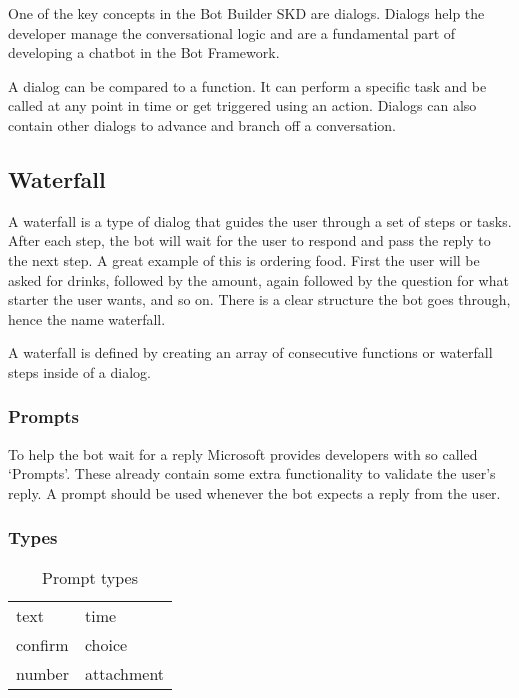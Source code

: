 One of the key concepts in the Bot Builder SKD are dialogs. Dialogs help the developer manage the conversational logic and are a fundamental part of developing a chatbot in the Bot Framework.

A dialog can be compared to a function. It can perform a specific task and be called at any point in time or get triggered using an action. Dialogs can also contain other dialogs to advance and branch off a conversation.

\subsection{Waterfall}

A waterfall is a type of dialog that guides the user through a set of steps or tasks. After each step, the bot will wait for the user to respond and pass the reply to the next step. A great example of this is ordering food. First the user will be asked for drinks, followed by the amount, again followed by the question for what starter the user wants, and so on. There is a clear structure the bot goes through, hence the name waterfall.

A waterfall is defined by creating an array of consecutive functions or waterfall steps inside of a dialog.

\subsubsection{Prompts}

To help the bot wait for a reply Microsoft provides developers with so called `Prompts'. These already contain some extra functionality to validate the user's reply. A prompt should be used whenever the bot expects a reply from the user.

\subsubsection{Types}

\renewcommand{\arraystretch}{1}
\begin{table}[ht]
	\centering
	\begin{tabular}{|l|l|}
		\hline
		text    & time       \\
		confirm & choice     \\
		number  & attachment \\
		\hline
	\end{tabular}
	\caption{Prompt types}
	\label{tab:prompt-types}
\end{table}


